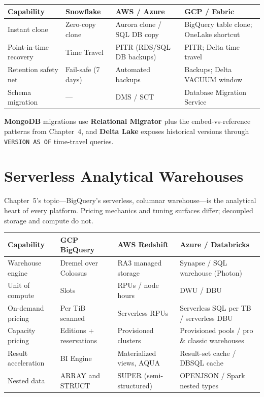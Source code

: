 \begin{center}
\footnotesize
\begin{tabular}{@{}p{2.8cm}p{3.0cm}p{3.0cm}p{3.4cm}@{}}
\toprule
\textbf{Capability} & \textbf{Snowflake} & \textbf{AWS / Azure} & \textbf{GCP / Fabric} \\
\midrule
Instant clone & Zero-copy clone & Aurora clone / SQL DB copy & BigQuery table clone; OneLake shortcut \\
Point-in-time recovery & Time Travel & PITR (RDS/SQL DB backups) & PITR; Delta time travel \\
Retention safety net & Fail-safe (7 days) & Automated backups & Backups; Delta VACUUM window \\
Schema migration & --- & DMS / SCT & Database Migration Service \\
\bottomrule
\end{tabular}
\end{center}

\noindent \textbf{MongoDB} migrations use \textbf{Relational Migrator} plus the embed-vs-reference
patterns from Chapter~4, and \textbf{Delta Lake} exposes historical versions through
\texttt{VERSION AS OF} time-travel queries.

\section{Serverless Analytical Warehouses}
%
Chapter~5's topic---BigQuery's serverless, columnar warehouse---is the analytical heart of every
platform. Pricing mechanics and tuning surfaces differ; decoupled storage and compute do not.

\begin{center}
\footnotesize
\begin{tabular}{@{}p{2.8cm}p{3.0cm}p{3.0cm}p{3.4cm}@{}}
\toprule
\textbf{Capability} & \textbf{GCP BigQuery} & \textbf{AWS Redshift} & \textbf{Azure / Databricks} \\
\midrule
Warehouse engine & Dremel over Colossus & RA3 managed storage & Synapse / SQL warehouse (Photon) \\
Unit of compute & Slots & RPUs / node hours & DWU / DBU \\
On-demand pricing & Per TiB scanned & Serverless RPUs & Serverless SQL per TB / serverless DBU \\
Capacity pricing & Editions + reservations & Provisioned clusters & Provisioned pools / pro \& classic warehouses \\
Result acceleration & BI Engine & Materialized views, AQUA & Result-set cache / DBSQL cache \\
Nested data & ARRAY and STRUCT & SUPER (semi-structured) & OPENJSON / Spark nested types \\
\bottomrule
\end{tabular}
\end{center}

